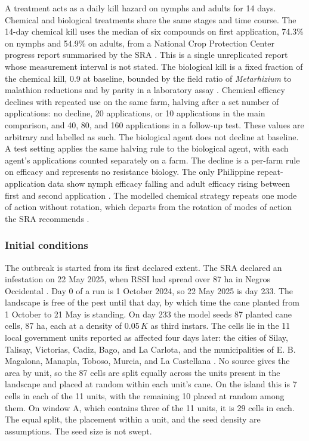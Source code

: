 A treatment acts as a daily kill hazard on nymphs and adults for 14 days. Chemical and biological treatments share the same stages and time course. The 14-day chemical kill uses the median of six compounds on first application, 74.3\% on nymphs and 54.9\% on adults, from a National Crop Protection Center progress report summarised by the SRA \citep{SRAnd}. This is a single unreplicated report whose measurement interval is not stated. The biological kill is a fixed fraction of the chemical kill, 0.9 at baseline, bounded by the field ratio of \emph{Metarhizium} to malathion reductions \citep{Sallam2021} and by parity in a laboratory assay \citep{Buletin2026}. Chemical efficacy declines with repeated use on the same farm, halving after a set number of applications: no decline, 20 applications, or 10 applications in the main comparison, and 40, 80, and 160 applications in a follow-up test. These values are arbitrary and labelled as such. The biological agent does not decline at baseline. A test setting applies the same halving rule to the biological agent, with each agent's applications counted separately on a farm. The decline is a per-farm rule on efficacy and represents no resistance biology. The only Philippine repeat-application data show nymph efficacy falling and adult efficacy rising between first and second application \citep{SRAnd}. The modelled chemical strategy repeats one mode of action without rotation, which departs from the rotation of modes of action the SRA recommends \citep{SRAnd}.

\subsubsection{Initial conditions}

The outbreak is started from its first declared extent. The SRA declared an infestation on 22 May 2025, when RSSI had spread over 87 ha in Negros Occidental \citep{ManilaBulletin2025}. Day 0 of a run is 1 October 2024, so 22 May 2025 is day 233. The landscape is free of the pest until that day, by which time the cane planted from 1 October to 21 May is standing. On day 233 the model seeds 87 planted cane cells, 87 ha, each at a density of 0.05\,$K$ as third instars. The cells lie in the 11 local government units reported as affected four days later: the cities of Silay, Talisay, Victorias, Cadiz, Bago, and La Carlota, and the municipalities of E. B. Magalona, Manapla, Toboso, Murcia, and La Castellana \citep{Guadalquiver2025}. No source gives the area by unit, so the 87 cells are split equally across the units present in the landscape and placed at random within each unit's cane. On the island this is 7 cells in each of the 11 units, with the remaining 10 placed at random among them. On window A, which contains three of the 11 units, it is 29 cells in each. The equal split, the placement within a unit, and the seed density are assumptions. The seed size is not swept.

